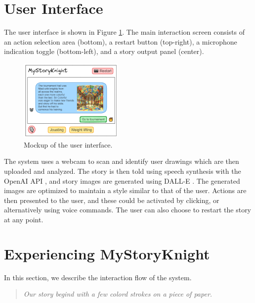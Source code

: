 \documentclass[submit,techrep,english]{ipsj}
\begin{document}
\section{User Interface}
\label{sec:user-interface}

The user interface is shown in Figure \ref{fig:user-interface}. The main interaction screen consists of an action selection area (bottom), a restart button (top-right), a microphone indication toggle (bottom-left), and a story output panel (center).

\begin{figure}[h]
    \centering
    \includegraphics[width=0.45\textwidth]{figures/user-interface.png}
    \caption{Mockup of the user interface.}
    \label{fig:user-interface}
\end{figure}

The system uses a webcam to scan and identify user drawings which are then uploaded and analyzed. The story is then told using speech synthesis with the OpenAI API \cite{20:openai-api}, and story images are generated using DALL-E \cite{21:dalle}. The generated images are optimized to maintain a style similar to that of the user. Actions are then presented to the user, and these could be activated by clicking, or alternatively using voice commands. The user can also choose to restart the story at any point.

\section{Experiencing MyStoryKnight}
\label{subsec:using-mystoryknight}
In this section, we describe the interaction flow of the system.

\vspace{10pt} %

\begin{quote}
    \textit{Our story begind with a few colord strokes on a piece of paper.}
\end{quote}

\vspace{10pt} %
\end{document}
